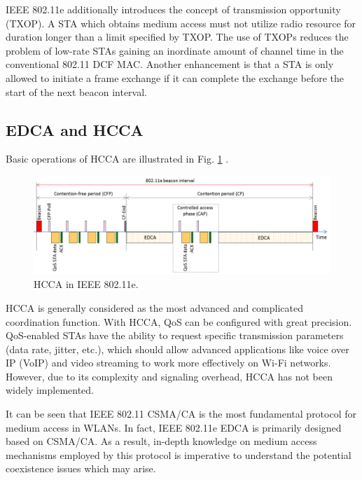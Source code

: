 IEEE 802.11e additionally introduces the concept of transmission opportunity (TXOP). A STA which obtains medium access must not utilize radio resource for duration longer than a limit specified by TXOP. The use of TXOPs reduces the problem of low-rate STAs gaining an inordinate amount of channel time in the conventional 802.11 DCF MAC. Another enhancement is that a STA is only allowed to initiate a frame exchange if it can complete the exchange before the start of the next beacon interval.

\subsection{EDCA and HCCA}
\label{edca-hcca}

Basic operations of HCCA are illustrated in Fig. \ref{figs:802-11e-HCCA} \cite{80211}. 
\begin{figure}[!ht]
	\centering
	\includegraphics[width=1.0\columnwidth]{figs/802-11e-HCCA}
	\caption{HCCA in IEEE 802.11e.}
	\label{figs:802-11e-HCCA}
\end{figure}
HCCA is generally considered as the most advanced and complicated coordination function. With HCCA, QoS can be configured with great precision. QoS-enabled STAs have the ability to request specific transmission parameters (data rate, jitter, etc.), which should allow advanced applications like voice over IP (VoIP) and video streaming to work more effectively on \mbox{Wi-Fi} networks. However, due to its complexity and signaling overhead, HCCA has not been widely implemented.

It can be seen that IEEE 802.11 CSMA/CA is the most fundamental protocol for medium access in WLANs. In fact, IEEE 802.11e EDCA is primarily designed based on CSMA/CA. As a result, in-depth knowledge on medium access mechanisms employed by this protocol is imperative to understand the potential coexistence issues which may arise.


